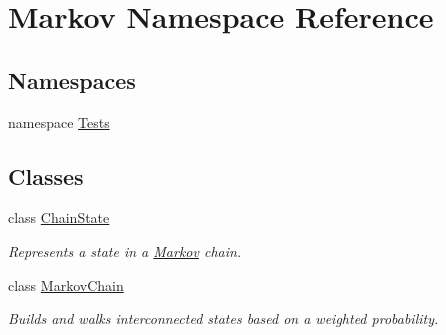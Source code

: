 \hypertarget{namespace_markov}{}\section{Markov Namespace Reference}
\label{namespace_markov}
\subsection*{Namespaces}
\begin{DoxyCompactItemize}
\item 
namespace \mbox{\hyperlink{namespace_markov_1_1_tests}{Tests}}
\end{DoxyCompactItemize}
\subsection*{Classes}
\begin{DoxyCompactItemize}
\item 
class \mbox{\hyperlink{class_markov_1_1_chain_state}{Chain\+State}}
\begin{DoxyCompactList}\small\item\em Represents a state in a \mbox{\hyperlink{namespace_markov}{Markov}} chain. \end{DoxyCompactList}\item 
class \mbox{\hyperlink{class_markov_1_1_markov_chain}{Markov\+Chain}}
\begin{DoxyCompactList}\small\item\em Builds and walks interconnected states based on a weighted probability. \end{DoxyCompactList}\end{DoxyCompactItemize}
